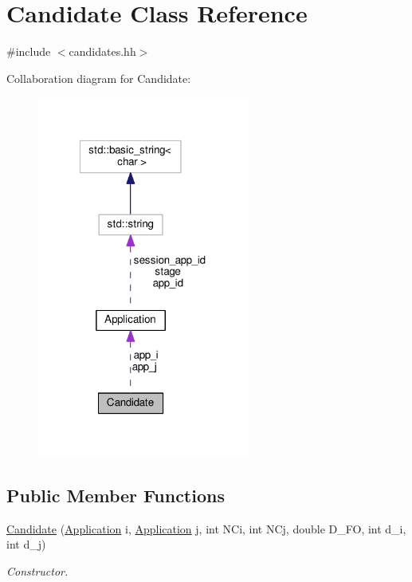 \hypertarget{classCandidate}{\section{Candidate Class Reference}
\label{classCandidate}
}


{\ttfamily \#include $<$candidates.\-hh$>$}



Collaboration diagram for Candidate\-:\nopagebreak
\begin{figure}[H]
\begin{center}
\leavevmode
\includegraphics[width=198pt]{classCandidate__coll__graph}
\end{center}
\end{figure}
\subsection*{Public Member Functions}
\begin{DoxyCompactItemize}
\item 
\hyperlink{classCandidate_a050c6cc5ed86d2a40cd2b2b0f79b8e13}{Candidate} (\hyperlink{classApplication}{Application} i, \hyperlink{classApplication}{Application} j, int N\-Ci, int N\-Cj, double D\-\_\-\-F\-O, int d\-\_\-i, int d\-\_\-j)
\begin{DoxyCompactList}\small\item\em Constructor. \end{DoxyCompactList}\end{DoxyCompactItemize}
